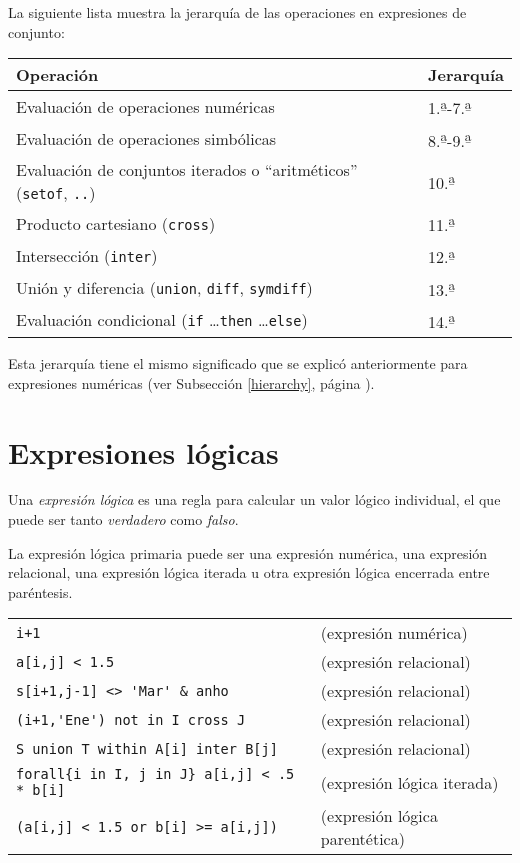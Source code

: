 \documentclass[11pt,spanish]{report}
\def\para#1{\noindent{\bf#1}}
\begin{document}
La siguiente lista muestra la jerarquía de las operaciones en expresiones de conjunto:

\noindent\hfil
\begin{tabular}{@{}ll@{}}
Operación&Jerarquía\\
\hline
Evaluación de operaciones numéricas&
1.{\textsuperscript{\b{a}}}-7.{\textsuperscript{\b{a}}}\\
Evaluación de operaciones simbólicas&
8.{\textsuperscript{\b{a}}}-9.{\textsuperscript{\b{a}}}\\
Evaluación de conjuntos iterados o ``aritméticos'' ({\tt setof}, {\tt..})&
10.{\textsuperscript{\b{a}}}\\
Producto cartesiano ({\tt cross})&
11.{\textsuperscript{\b{a}}}\\
Intersección ({\tt inter})&
12.{\textsuperscript{\b{a}}}\\
Unión y diferencia ({\tt union}, {\tt diff}, {\tt symdiff})&
13.{\textsuperscript{\b{a}}}\\
Evaluación condicional ({\tt if} \dots {\tt then} \dots {\tt else})&
14.{\textsuperscript{\b{a}}}\\
\end{tabular}

Esta jerarquía tiene el mismo significado que se explicó anteriormente para expresiones numéricas (ver Subsección \ref{hierarchy}, página \pageref{hierarchy}).

\section{Expresiones lógicas}

Una {\it expresión lógica} es una regla para calcular un valor lógico individual, el que puede ser tanto {\it verdadero} como {\it falso}.

La expresión lógica primaria puede ser una expresión numérica, una expresión relacional, una expresión lógica iterada u otra expresión lógica encerrada entre paréntesis.

\para{Ejemplos}

\noindent
\begin{tabular}{@{}ll@{}}
\verb|i+1| &(expresión numérica)\\
\verb|a[i,j] < 1.5| &(expresión relacional)\\
\verb|s[i+1,j-1] <> 'Mar' & anho | &(expresión relacional)\\
\verb|(i+1,'Ene') not in I cross J| &(expresión relacional)\\
\verb|S union T within A[i] inter B[j]| &(expresión relacional)\\
\verb|forall{i in I, j in J} a[i,j] < .5 * b[i]| &(expresión lógica iterada)\\
\verb|(a[i,j] < 1.5 or b[i] >= a[i,j])| &(expresión lógica parentética)\\
\end{tabular}
\end{document}
